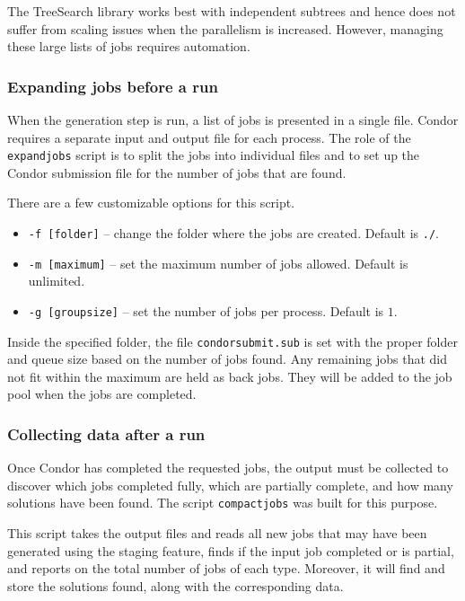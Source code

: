 \documentclass[11pt]{article}
\def\TreeSearch{{TreeSearch}}
\begin{document}
The {\TreeSearch} library works best with independent subtrees
	 and hence does not suffer from scaling issues when the parallelism is increased.
However, managing these large lists of jobs requires automation.

\subsubsection{Expanding jobs before a run}

When the generation step is run, a list of jobs is presented in a single file.
Condor requires a separate input and output file for each process.
The role of the \texttt{expandjobs} script is to split the jobs into individual 
	files and to set up the Condor submission file for the number of jobs that are found.

There are a few customizable options for this script.

\begin{itemize}
	\item \texttt{-f [folder]} -- change the folder where the jobs are created.  Default is \texttt{./}.
	\item \texttt{-m [maximum]} -- set the maximum number of jobs allowed.  Default is unlimited.
	\item \texttt{-g [groupsize]} -- set the number of jobs per process. Default is $1$.
\end{itemize}

Inside the specified folder, the file \texttt{condorsubmit.sub} is set with
	the proper folder and queue size based on the number of jobs found.
Any remaining jobs that did not fit within the maximum are held as back jobs.
They will be added to the job pool when the jobs are completed.

\subsubsection{Collecting data after a run}

Once Condor has completed the requested jobs, the output must be collected to 
	discover which jobs completed fully, which are partially complete,
	and how many solutions have been found.
The script \texttt{compactjobs} was built for this purpose.

This script takes the output files and reads all new jobs that may have been generated 
	using the staging feature, finds if the input job completed or is partial,
	and reports on the total number of jobs of each type.
Moreover, it will find and store the solutions found, along with the corresponding data.
\end{document}
